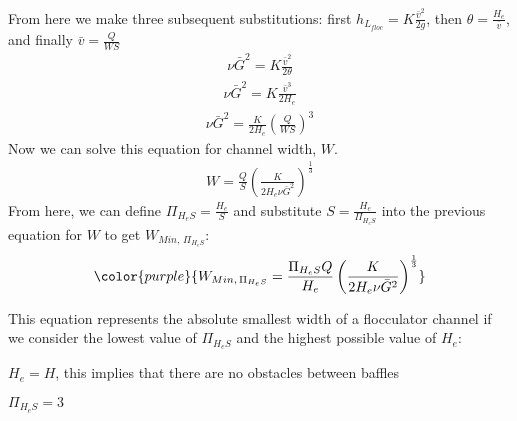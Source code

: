 \documentclass[letterpaper,10pt,english]{sphinxmanual}
\begin{document}
{From here we make three subsequent substitutions: first
\(h_{L_{floc}} = K \frac{\bar v^2}{2g}\), then
\(\theta = \frac{H_e}{\bar v}\), and finally
\(\bar v = \frac{Q}{WS}\)
\begin{equation}\label{equation:Flocculation/Floc_Derivations:Flocculation/Floc_Derivations:1}
\begin{split}\nu \bar G^2 = K \frac{\bar v^2}{2 \theta}\end{split}
\end{equation}\begin{equation}\label{equation:Flocculation/Floc_Derivations:Flocculation/Floc_Derivations:2}
\begin{split}\nu \bar G^2 = K \frac{\bar v^3}{2 H_e}\end{split}
\end{equation}\begin{equation}\label{equation:Flocculation/Floc_Derivations:Flocculation/Floc_Derivations:3}
\begin{split}\nu \bar G^2 = \frac{K}{2 H_e} \left( \frac{Q}{WS} \right)^3\end{split}
\end{equation}
Now we can solve this equation for channel width, \(W\).
\begin{equation}\label{equation:Flocculation/Floc_Derivations:Flocculation/Floc_Derivations:4}
\begin{split}W = \frac{Q}{S}\left( \frac{K}{2 H_e \nu \bar G^2} \right)^\frac{1}{3}\end{split}
\end{equation}
From here, we can define \(\Pi_{H_eS} = \frac{H_e}{S}\) and
substitute \(S = \frac{H_e}{\Pi_{H_eS}}\) into the previous equation
for \(W\) to get \(W_{Min, \, \Pi_{H_eS}}\):
\begin{equation}\label{equation:Flocculation/Floc_Derivations:Flocculation/Floc_Derivations:5}
\begin{split}\color{purple}{
W_{Min, \, \Pi_{H_eS}} = \frac{\Pi_{H_eS}Q}{H_e}\left( \frac{K}{2 H_e \nu \bar G^2} \right)^\frac{1}{3}
}\end{split}
\end{equation}
\begin{DUlineblock}{0em}
\item[] This equation represents the absolute smallest width of a flocculator
channel if we consider the lowest value of \(\Pi_{H_eS}\) and the
highest possible value of \(H_e\):
\item[] \(H_e = H\), this implies that there are no obstacles between
baffles
\item[] \(\Pi_{H_eS} = 3\)
\end{DUlineblock}


}
\end{document}
